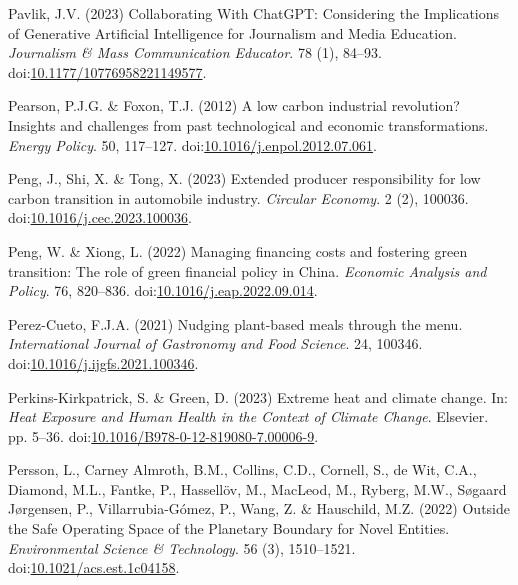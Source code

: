 \documentclass[
  letterpaper,
  DIV=11,
  numbers=noendperiod]{scrartcl}
\newlength{\cslhangindent}
\newenvironment{CSLReferences}[2] %
 {\begin{list}{}{%
  \setlength{\itemindent}{0pt}
  \setlength{\leftmargin}{0pt}
  \setlength{\parsep}{0pt}
  \ifodd #1
   \setlength{\leftmargin}{\cslhangindent}
   \setlength{\itemindent}{-1\cslhangindent}
  \fi
  \setlength{\itemsep}{#2\baselineskip}}}
 {\end{list}}
\begin{document}
\begin{CSLReferences}{0}{1}
Pavlik, J.V. (2023) Collaborating {With ChatGPT}: {Considering} the
{Implications} of {Generative Artificial Intelligence} for {Journalism}
and {Media Education}. \emph{Journalism \& Mass Communication Educator}.
78 (1), 84--93.
doi:\href{https://doi.org/10.1177/10776958221149577}{10.1177/10776958221149577}.

Pearson, P.J.G. \& Foxon, T.J. (2012) A low carbon industrial
revolution? {Insights} and challenges from past technological and
economic transformations. \emph{Energy Policy}. 50, 117--127.
doi:\href{https://doi.org/10.1016/j.enpol.2012.07.061}{10.1016/j.enpol.2012.07.061}.

Peng, J., Shi, X. \& Tong, X. (2023) Extended producer responsibility
for low carbon transition in automobile industry. \emph{Circular
Economy}. 2 (2), 100036.
doi:\href{https://doi.org/10.1016/j.cec.2023.100036}{10.1016/j.cec.2023.100036}.

Peng, W. \& Xiong, L. (2022) Managing financing costs and fostering
green transition: {The} role of green financial policy in {China}.
\emph{Economic Analysis and Policy}. 76, 820--836.
doi:\href{https://doi.org/10.1016/j.eap.2022.09.014}{10.1016/j.eap.2022.09.014}.

Perez-Cueto, F.J.A. (2021) Nudging plant-based meals through the menu.
\emph{International Journal of Gastronomy and Food Science}. 24, 100346.
doi:\href{https://doi.org/10.1016/j.ijgfs.2021.100346}{10.1016/j.ijgfs.2021.100346}.

Perkins-Kirkpatrick, S. \& Green, D. (2023) Extreme heat and climate
change. In: \emph{Heat {Exposure} and {Human Health} in the {Context} of
{Climate Change}}. Elsevier. pp. 5--36.
doi:\href{https://doi.org/10.1016/B978-0-12-819080-7.00006-9}{10.1016/B978-0-12-819080-7.00006-9}.

Persson, L., Carney Almroth, B.M., Collins, C.D., Cornell, S., de Wit,
C.A., Diamond, M.L., Fantke, P., Hassellöv, M., MacLeod, M., Ryberg,
M.W., Søgaard Jørgensen, P., Villarrubia-Gómez, P., Wang, Z. \&
Hauschild, M.Z. (2022) Outside the {Safe Operating Space} of the
{Planetary Boundary} for {Novel Entities}. \emph{Environmental Science
\& Technology}. 56 (3), 1510--1521.
doi:\href{https://doi.org/10.1021/acs.est.1c04158}{10.1021/acs.est.1c04158}.


\end{CSLReferences}
\end{document}
